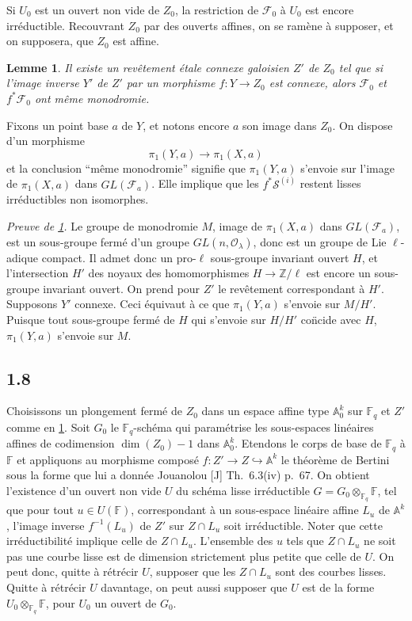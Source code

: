 \documentclass[11pt,a4paper]{article}
\theoremstyle{plain}
\newtheorem{lemma}[theorem]{Lemme}
\theoremstyle{definition}
\begin{document}
Si $U_0$ est un ouvert non vide de $Z_0$, la restriction de $\mathcal{F}_0$ \`a $U_0$ est encore irr\'eductible. Recouvrant $Z_0$ par des ouverts affines, on se ram\`ene \`a supposer, et on supposera, que $Z_0$ est affine.

\begin{lemma}\label{lem:1.7}
Il existe un rev\^etement \'etale connexe galoisien $Z'$ de $Z_0$ tel que si l'image inverse $Y'$ de $Z'$ par un morphisme $f: Y \to Z_0$ est connexe, alors $\mathcal{F}_0$ et $f^* \mathcal{F}_0$ ont m\^eme monodromie.
\end{lemma}

Fixons un point base $a$ de $Y$, et notons encore $a$ son image dans $Z_0$. On dispose d'un morphisme
\[
\pi_1(Y,a) \to \pi_1(X,a)
\]
et la conclusion ``m\^eme monodromie'' signifie que $\pi_1(Y,a)$ s'envoie sur l'image de $\pi_1(X,a)$ dans $GL(\mathcal{F}_a)$. Elle implique que les $f^* \mathcal{S}^{(i)}$ restent lisses irr\'eductibles non isomorphes.

\noindent\textit{Preuve de \ref{lem:1.7}.} Le groupe de monodromie $M$, image de $\pi_1(X,a)$ dans $GL(\mathcal{F}_a)$, est un sous-groupe ferm\'e d'un groupe $GL(n, \mathcal{O}_\lambda)$, donc est un groupe de Lie $\ell$-adique compact. Il admet donc un pro-$\ell$ sous-groupe invariant ouvert $H$, et l'intersection $H'$ des noyaux des homomorphismes $H \to \mathbb{Z}/\ell$ est encore un sous-groupe invariant ouvert. On prend pour $Z'$ le rev\^etement correspondant \`a $H'$. Supposons $Y'$ connexe. Ceci \'equivaut \`a ce que $\pi_1(Y,a)$ s'envoie sur $M/H'$. Puisque tout sous-groupe ferm\'e de $H$ qui s'envoie sur $H/H'$ co\"ncide avec $H$, $\pi_1(Y,a)$ s'envoie sur $M$.

\subsection{1.8}

Choisissons un plongement ferm\'e de $Z_0$ dans un espace affine type $\mathbb{A}_0^{k}$ sur $\mathbb{F}_q$ et $Z'$ comme en \ref{lem:1.7}. Soit $G_0$ le $\mathbb{F}_q$-sch\'ema qui param\'etrise les sous-espaces lin\'eaires affines de codimension $\dim(Z_0)-1$ dans $\mathbb{A}_0^{k}$. Etendons le corps de base de $\mathbb{F}_q$ \`a $\mathbb{F}$ et appliquons au morphisme compos\'e $f: Z' \to Z \hookrightarrow \mathbb{A}^{k}$ le th\'eor\`eme de Bertini sous la forme que lui a donn\'ee Jouanolou [J] Th.~6.3(iv) p.~67. On obtient l'existence d'un ouvert non vide $U$ du sch\'ema lisse irr\'eductible $G = G_0 \otimes_{\mathbb{F}_q} \mathbb{F}$, tel que pour tout $u \in U(\mathbb{F})$, correspondant \`a un sous-espace lin\'eaire affine $L_u$ de $\mathbb{A}^{k}$, l'image inverse $f^{-1}(L_u)$ de $Z'$ sur $Z \cap L_u$ soit irr\'eductible. Noter que cette irr\'eductibilit\'e implique celle de $Z \cap L_u$. L'ensemble des $u$ tels que $Z \cap L_u$ ne soit pas une courbe lisse est de dimension strictement plus petite que celle de $U$. On peut donc, quitte \`a r\'etr\'ecir $U$, supposer que les $Z \cap L_u$ sont des courbes lisses. Quitte \`a r\'etr\'ecir $U$ davantage, on peut aussi supposer que $U$ est de la forme $U_0 \otimes_{\mathbb{F}_q} \mathbb{F}$, pour $U_0$ un ouvert de $G_0$.
\end{document}
